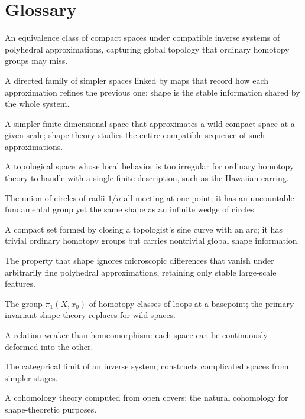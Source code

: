 \section*{Glossary}
\begin{description}[leftmargin=*,style=nextline,itemsep=0.3em]
\item[\textbf{Shape.}] An equivalence class of compact spaces under compatible inverse systems of polyhedral approximations, capturing global topology that ordinary homotopy groups may miss.
\item[\textbf{Inverse system.}] A directed family of simpler spaces linked by maps that record how each approximation refines the previous one; shape is the stable information shared by the whole system.
\item[\textbf{Polyhedral approximation.}] A simpler finite-dimensional space that approximates a wild compact space at a given scale; shape theory studies the entire compatible sequence of such approximations.
\item[\textbf{Wild space.}] A topological space whose local behavior is too irregular for ordinary homotopy theory to handle with a single finite description, such as the Hawaiian earring.
\item[\textbf{Hawaiian earring.}] The union of circles of radii $1/n$ all meeting at one point; it has an uncountable fundamental group yet the same shape as an infinite wedge of circles.
\item[\textbf{Warsaw circle.}] A compact set formed by closing a topologist's sine curve with an arc; it has trivial ordinary homotopy groups but carries nontrivial global shape information.
\item[\textbf{Shape invariance.}] The property that shape ignores microscopic differences that vanish under arbitrarily fine polyhedral approximations, retaining only stable large-scale features.
\item[\textbf{Fundamental group.}] The group $\pi_1(X,x_0)$ of homotopy classes of loops at a basepoint; the primary invariant shape theory replaces for wild spaces.
\item[\textbf{Homotopy equivalence.}] A relation weaker than homeomorphism: each space can be continuously deformed into the other.
\item[\textbf{Inverse limit.}] The categorical limit of an inverse system; constructs complicated spaces from simpler stages.
\item[\textbf{\v{C}ech cohomology.}] A cohomology theory computed from open covers; the natural cohomology for shape-theoretic purposes.
\end{description}
